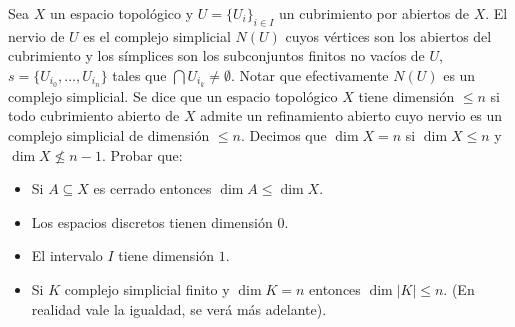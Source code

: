\documentclass[11pt]{article}
\newcommand{\paint}[2]{\color{#1}{#2}}
\newenvironment{exercise}[2][Ejercicio]{\begin{trivlist}
\item[\hskip \labelsep \paint{grey-light-blue}{{\bfseries #1}}\hskip \labelsep {\bfseries #2.}]}{\end{trivlist}}
\begin{document}
\begin{exercise}{3} Sea $X$ un espacio topol\'ogico y $U = \{U_i\}_{i \in I}$ un cubrimiento por abiertos de $X$. El nervio de $U$
es el complejo simplicial $N(U)$ cuyos v\'ertices son los abiertos del cubrimiento y los s\'implices
son los subconjuntos finitos no vac\'ios de $U$, $s = \{U_{i_0}, \dots , U_{i_n} \}$ tales que $\bigcap U_{i_k} \neq \emptyset$. Notar que efectivamente $N(U)$ es un complejo simplicial. Se dice que un espacio topol\'ogico $X$ tiene dimensi\'on $\leq n$ si todo cubrimiento abierto de $X$ admite un refinamiento abierto cuyo nervio es un complejo simplicial de dimensi\'on $\leq n$. Decimos que $\dim X = n$ si $\dim X \leq n$ y $\dim X \not \leq n - 1$. Probar que:
\begin{itemize}
\item[a)] Si $A \subseteq X$ es cerrado entonces $\dim A \leq \dim X$.
\item[b)] Los espacios discretos tienen dimensi\'on $0$.
\item[c)] El intervalo $I$ tiene dimensi\'on $1$.
\item[d)] Si $K$ complejo simplicial finito y $\dim K = n$ entonces $\dim |K| \leq n$. (En realidad vale la igualdad, se ver\'a m\'as adelante).
\end{itemize}
\end{exercise}
\end{document}
